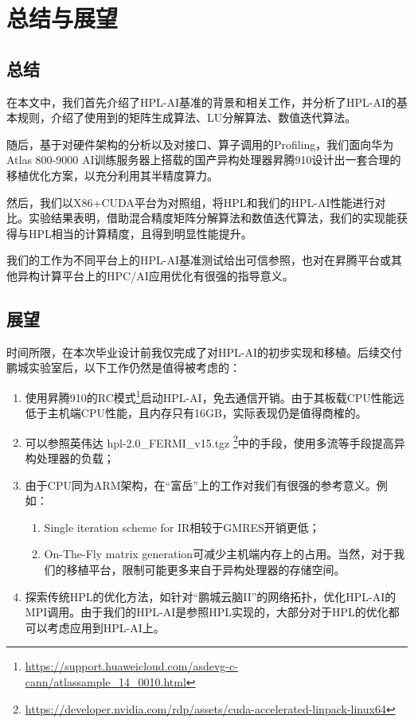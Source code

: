 \chapter{总结与展望}
\label{总结与展望}

\section{总结}

在本文中，我们首先介绍了HPL-AI基准的背景和相关工作，并分析了HPL-AI的基本规则，介绍了使用到的矩阵生成算法、LU分解算法、数值迭代算法。

随后，基于对硬件架构的分析以及对接口、算子调用的Profiling，我们面向华为Atlas 800-9000 AI训练服务器上搭载的国产异构处理器昇腾910设计出一套合理的移植优化方案，以充分利用其半精度算力。

然后，我们以X86+CUDA平台为对照组，将HPL和我们的HPL-AI性能进行对比。实验结果表明，借助混合精度矩阵分解算法和数值迭代算法，我们的实现能获得与HPL相当的计算精度，且得到明显性能提升。

我们的工作为不同平台上的HPL-AI基准测试给出可信参照，也对在昇腾平台或其他异构计算平台上的HPC/AI应用优化有很强的指导意义。

\section{展望}

时间所限，在本次毕业设计前我仅完成了对HPL-AI的初步实现和移植。后续交付鹏城实验室后，以下工作仍然是值得被考虑的：

\begin{enumerate}
    \item 使用昇腾910的RC模式\footnote{\url{https://support.huaweicloud.com/asdevg-c-cann/atlassample_14_0010.html}}启动HPL-AI，免去通信开销。由于其板载CPU性能远低于主机端CPU性能，且内存只有16GB，实际表现仍是值得商榷的。
    \item 可以参照英伟达 hpl-2.0\_FERMI\_v15.tgz \footnote{\url{https://developer.nvidia.com/rdp/assets/cuda-accelerated-linpack-linux64}}中的手段，使用多流等手段提高异构处理器的负载；
    \item 由于CPU同为ARM架构，\cite{DBLP:conf/scala-ws/KudoNII20}在``富岳''上的工作对我们有很强的参考意义。例如：
          \begin{enumerate}
              \item Single iteration scheme for IR相较于GMRES开销更低；
              \item On-The-Fly matrix generation可减少主机端内存上的占用。当然，对于我们的移植平台，限制可能更多来自于异构处理器的存储空间。
          \end{enumerate}
    \item 探索传统HPL的优化方法，如针对``鹏城云脑II''的网络拓扑，优化HPL-AI的MPI调用。由于我们的HPL-AI是参照HPL实现的，大部分对于HPL的优化都可以考虑应用到HPL-AI上。
\end{enumerate}
